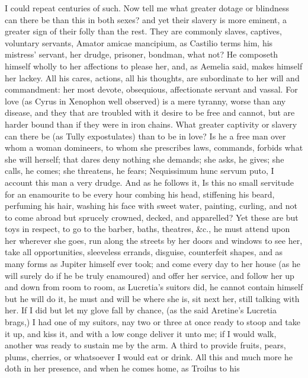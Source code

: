 {I could repeat centuries of such. Now tell me what greater dotage or
blindness can there be than this in both sexes? and yet their slavery
is more eminent, a greater sign of their folly than the rest.
They are commonly slaves, captives, voluntary servants, Amator amicae
mancipium, as Castilio terms him, his mistress' servant, her
drudge, prisoner, bondman, what not? He composeth himself wholly to her
affections to please her, and, as Aemelia said, makes himself her
lackey. All his cares, actions, all his thoughts, are subordinate to
her will and commandment: her most devote, obsequious, affectionate
servant and vassal. For love (as Cyrus in Xenophon well observed)
is a mere tyranny, worse than any disease, and they that are troubled
with it desire to be free and cannot, but are harder bound than if they
were in iron chains. What greater captivity or slavery can there be (as
Tully expostulates) than to be in love? Is he a free man over
whom a woman domineers, to whom she prescribes laws, commands, forbids
what she will herself; that dares deny nothing she demands; she asks,
he gives; she calls, he comes; she threatens, he fears; Nequissimum
hunc servum puto, I account this man a very drudge. And as he follows
it, Is this no small servitude for an enamourite to be every hour
combing his head, stiffening his beard, perfuming his hair, washing his
face with sweet water, painting, curling, and not to come abroad but
sprucely crowned, decked, and apparelled? Yet these are but toys in
respect, to go to the barber, baths, theatres, \&c., he must attend upon
her wherever she goes, run along the streets by her doors and windows
to see her, take all opportunities, sleeveless errands, disguise,
counterfeit shapes, and as many forms as Jupiter himself ever took; and
come every day to her house (as he will surely do if he be truly
enamoured) and offer her service, and follow her up and down from room
to room, as Lucretia's suitors did, he cannot contain himself but he
will do it, he must and will be where she is, sit next her, still
talking with her. If I did but let my glove fall by chance, (as
the said Aretine's Lucretia brags,) I had one of my suitors, nay two or
three at once ready to stoop and take it up, and kiss it, and with a
low conge deliver it unto me; if I would walk, another was ready to
sustain me by the arm. A third to provide fruits, pears, plums,
cherries, or whatsoever I would eat or drink. All this and much more he
doth in her presence, and when he comes home, as Troilus to his
}

